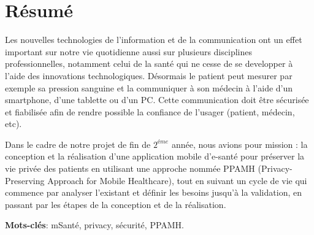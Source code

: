 
\chapter*{Résumé}

Les nouvelles technologies de l’information et de la communication ont un effet important sur notre vie quotidienne aussi sur plusieurs disciplines professionnelles, notamment celui de la santé qui ne cesse de se developper à l’aide des innovations technologiques. Désormais le patient peut mesurer par exemple sa pression sanguine et la communiquer à son médecin à l’aide d’un smartphone, d’une tablette ou d’un PC. Cette communication doit \^etre sécurisée et fiabilisée afin de rendre possible la confiance de l'usager (patient, médecin, etc).

\vspace{6pt}
\paragraphmark

Dans le cadre de notre projet de fin de $2^{éme}$ année, nous avions pour mission : la conception et la réalisation d'une application mobile d'e-santé pour préserver la vie privée des patients en utilisant une approche nommée PPAMH (Privacy-Preserving Approach for Mobile Healthcare), tout en suivant un cycle de vie qui commence par analyser l’existant et définir les besoins jusqu’à la validation, en passant par les étapes de la conception et de la réalisation.

\vspace{35pt}
\paragraphmark

\textbf{Mots-clés}: mSanté, privacy, sécurité, PPAMH.